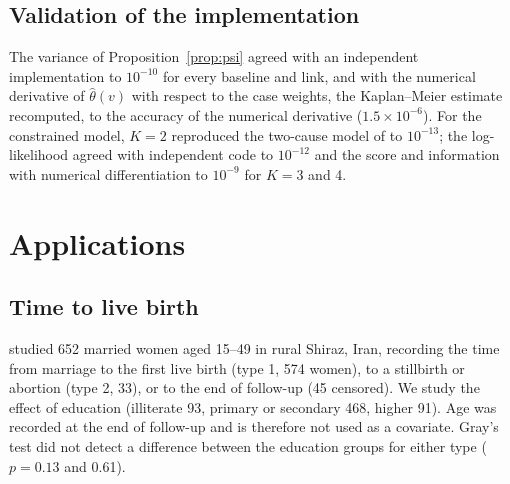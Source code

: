 \documentclass[11pt]{article}
\begin{document}
\subsection{Validation of the implementation}\label{sec:valid}
The variance of Proposition~\ref{prop:psi} agreed with an independent implementation to $10^{-10}$
for every baseline and link, and with the numerical derivative of $\hat\theta(v)$ with respect to
the case weights, the Kaplan--Meier estimate recomputed, to the accuracy of the numerical
derivative ($1.5 \times 10^{-6}$). For the constrained model, $K = 2$ reproduced the two-cause model
of \citet{shi2013} to $10^{-13}$; the log-likelihood agreed with independent code to $10^{-12}$
and the score and information with numerical differentiation to $10^{-9}$ for $K = 3$ and 4.

\section{Applications}\label{sec:apps}
\subsection{Time to live birth}\label{sec:fert}
\citet{shayan2011} studied 652 married women aged 15--49 in rural Shiraz, Iran, recording the time
from marriage to the first live birth (type 1, 574 women), to a stillbirth or abortion (type 2, 33),
or to the end of follow-up (45 censored). We study the effect of education (illiterate 93,
primary or secondary 468, higher 91). Age was recorded at the end of follow-up and is therefore not
used as a covariate. Gray's test did not detect a difference between the education groups for either
type ($p = 0.13$ and 0.61).
\end{document}
